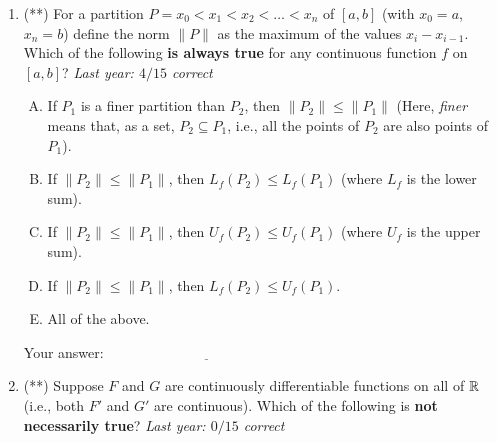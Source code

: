 \documentclass[10pt]{amsart}
\begin{document}
\begin{enumerate}
  \begin{enumerate}[(A)]
  \item $m \le n$
  \item $n \le m$
  \item $m$ divides $n$ (i.e., $n$ is a multiple of $m$)
  \item $n$ divides $m$ (i.e., $m$ is a multiple of $n$)
  \item $m$ is a power of $n$
  \end{enumerate}

  \vspace{0.1in}
  Your answer: $\underline{\qquad\qquad\qquad\qquad\qquad\qquad\qquad}$
  \vspace{1in}


  {\bf PLEASE TURN OVER FOR THIRD AND FOURTH QUESTIONS}
\newpage
\item (**) For a partition $P = x_0 < x_1 < x_2 < \dots < x_n$ of
  $[a,b]$ (with $x_0 = a$, $x_n = b$) define the norm $\| P \|$ as the
  maximum of the values $x_i - x_{i-1}$. Which of the following {\bf
  is always true} for any continuous function $f$ on $[a,b]$? {\em
  Last year: $4/15$ correct}

  \begin{enumerate}[(A)]
  \item If $P_1$ is a finer partition than $P_2$, then $\| P_2 \| \le
    \| P_1 \|$ (Here, {\em finer} means that, as a set, $P_2 \subseteq
    P_1$, i.e., all the points of $P_2$ are also points of $P_1$).
  \item If $\| P_2 \| \le \| P_1 \|$, then $L_f(P_2) \le L_f(P_1)$
    (where $L_f$ is the lower sum).
  \item If $\| P_2 \| \le \| P_1 \|$, then $U_f(P_2) \le U_f(P_1)$
    (where $U_f$ is the upper sum).
  \item If $\| P_2 \| \le \| P_1 \|$, then $L_f(P_2) \le U_f(P_1)$.
  \item All of the above.
  \end{enumerate}

  \vspace{0.1in}
  Your answer: $\underline{\qquad\qquad\qquad\qquad\qquad\qquad\qquad}$
  \vspace{1in}

\item (**) Suppose $F$ and $G$ are continuously differentiable
  functions on all of $\mathbb{R}$ (i.e., both $F'$ and $G'$ are
  continuous). Which of the following is {\bf not necessarily true}?
  {\em Last year: $0/15$ correct}


\end{enumerate}
\end{document}
